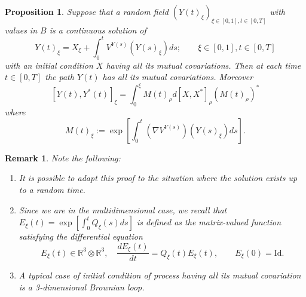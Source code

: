 \documentclass[a4paper,12pt,reqno]{amsart}
\newcommand{\R}{\mathbb{R}}
\newtheorem{proposition}{Proposition}
\newtheorem{remark}{Remark}
\newcommand{\RR}{\mathbb{R}^3}
\begin{document}
\begin{proposition} \label{PQVar} 
Suppose that a random field $(Y(t)_\xi)_{\xi \in [0,1], t \in [0,T]}$ with values in $B$ is a continuous solution of
\begin{equation} \label{EQVar}
 Y(t)_\xi = X_\xi + \int_0^t V^{Y(s)} (Y(s)_\xi) ds;\qquad \xi \in
 [0,1], t \in [0,T] 
\end{equation}
 with an
  initial condition $X$ having all its mutual covariations.
Then at each time $t \in [0,T]$ the path $Y(t)$ has all its mutual covariations.
Moreover
\begin{equation}
  \label{eq:EQVar2}
[Y(t), Y^*(t)]_\xi  =   \int_0^\xi  M(t)_\rho  d[X,X^*]_\rho (M(t)_\rho)^*  
\end{equation}
where
\begin{equation}
  \label{eq:Mprocess}
M(t)_\xi := \exp \left[\int_0^t
(\nabla V^{Y(s)})(Y(s)_\xi) ds \right].  
\end{equation}
\end{proposition}

\begin{remark} \label{RQVar} 
Note the following:
\begin{enumerate}
\item It is possible to adapt this proof to the situation where the
  solution exists up to a random time.
\item Since we are in the multidimensional   case, 
we recall that $E_{\xi}(t) = \exp \left[\int_0^t
Q_\xi(s) ds \right]$ is defined as the
matrix-valued function satisfying the differential equation
$$
E_\xi(t) \in \RR \otimes \RR , \quad \frac{d E_\xi(t)}{dt} = Q_\xi(t) E_\xi(t), \qquad
E_\xi(0) = \text{Id}.
$$
\item A typical case of initial condition of process having
all its mutual covariation is a 3-dimensional Brownian loop. 
\end{enumerate}
\end{remark}
\end{document}
